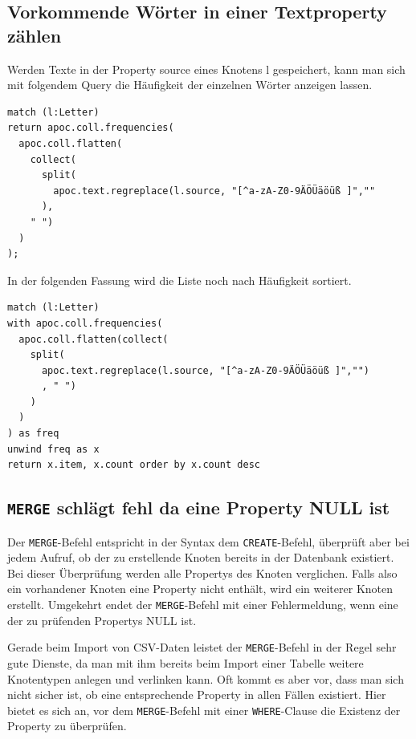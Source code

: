 \documentclass[12pt,ngerman,]{article}
\begin{document}
\subsection{Vorkommende Wörter in einer Textproperty
zählen}\label{vorkommende-wuxf6rter-in-einer-textproperty-zuxe4hlen}

Werden Texte in der Property source eines Knotens l gespeichert, kann
man sich mit folgendem Query die Häufigkeit der einzelnen Wörter
anzeigen lassen.

\begin{verbatim}
match (l:Letter)
return apoc.coll.frequencies(
  apoc.coll.flatten(
    collect(
      split(
        apoc.text.regreplace(l.source, "[^a-zA-Z0-9ÄÖÜäöüß ]",""
      ),
    " ")
  )
);
\end{verbatim}

In der folgenden Fassung wird die Liste noch nach Häufigkeit sortiert.

\begin{verbatim}
match (l:Letter)
with apoc.coll.frequencies(
  apoc.coll.flatten(collect(
    split(
      apoc.text.regreplace(l.source, "[^a-zA-Z0-9ÄÖÜäöüß ]","")
      , " ")
    )
  )
) as freq
unwind freq as x
return x.item, x.count order by x.count desc
\end{verbatim}

\subsection{\texorpdfstring{\texttt{MERGE} schlägt fehl da eine Property
NULL
ist}{MERGE schlägt fehl da eine Property NULL ist}}\label{merge-schluxe4gt-fehl-da-eine-property-null-ist}

Der \texttt{MERGE}-Befehl entspricht in der Syntax dem
\texttt{CREATE}-Befehl, überprüft aber bei jedem Aufruf, ob der zu
erstellende Knoten bereits in der Datenbank existiert. Bei dieser
Überprüfung werden alle Propertys des Knoten verglichen. Falls also ein
vorhandener Knoten eine Property nicht enthält, wird ein weiterer Knoten
erstellt. Umgekehrt endet der \texttt{MERGE}-Befehl mit einer
Fehlermeldung, wenn eine der zu prüfenden Propertys NULL ist.

Gerade beim Import von CSV-Daten leistet der \texttt{MERGE}-Befehl in
der Regel sehr gute Dienste, da man mit ihm bereits beim Import einer
Tabelle weitere Knotentypen anlegen und verlinken kann. Oft kommt es
aber vor, dass man sich nicht sicher ist, ob eine entsprechende Property
in allen Fällen existiert. Hier bietet es sich an, vor dem
\texttt{MERGE}-Befehl mit einer \texttt{WHERE}-Clause die Existenz der
Property zu überprüfen.
\end{document}
